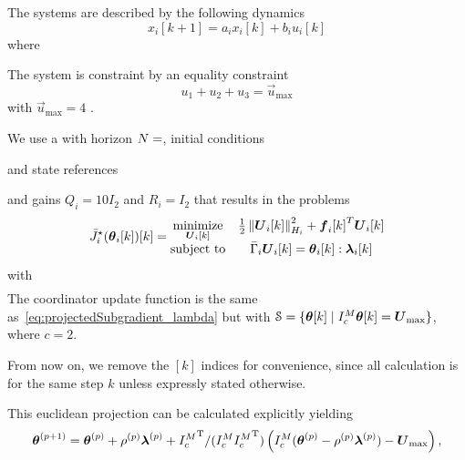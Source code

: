 \documentclass[../main.tex]{subfiles}
\begin{document}
The systems are described by the following \ltidt{} dynamics
\begin{equation}
  \label{eq:example_dynamics}
  x_{i}[k+1]=a_{i}x_{i}[k]+b_{i}u_{i}[k]
\end{equation}
where

The system is
constraint by an equality constraint
\begin{equation}
  \label{eq:example_equality}
  u_{1}+u_{2}+u_{3}=\vec{u}_{\max}
\end{equation}
with
$\vec{u}_{\max}=4$
.

We use a \dmpc{} with horizon ${N=}$,
initial conditions

and state references

and gains
$Q_{i}=10I_{2}$ and
$R_{i}=   I_{2}$
that results in the problems
\begin{equation}
    \eqoptobji(\thetaik)[k]=
    \begin{matrix}
    \minimize\limits_{\vec{U}_{i}[k]}&\frac{1}{2}\norm{\vec{U}_{i}[k]}^{2}_{H_{i}} + {\vec{f}_{i}[k]}^{T}\vec{U}_{i}[k]\\
    \mathrm{subject~ to} & \bar{\Gamma}_{i}\vec{U}_{i}[k] = \thetaik:\lambdaik
  \end{matrix}
  \label{eq:example_local_problem}
\end{equation}
with
\begin{equation}
  \label{eq:1}
  \begin{array}{lll}
    
  \end{array}
\end{equation}
The coordinator update function is the same as~\eqref{eq:projectedSubgradient_lambda} but with ${\mathcal{S} = \{\boldsymbol{\theta}[k]\mid I_{c}^{M}\boldsymbol{\theta}[k] = \boldsymbol{U}_{\max}\}}$, where $c=2$.

From now on, we remove the $[k]$ indices for convenience, since all calculation is for the same step $k$ unless expressly stated otherwise.

This euclidean projection can be calculated explicitly yielding
\begin{equation}
  \label{eq:euclidean_projection_equality_solution}
    \boldsymbol{\theta}^{(p+1)}=\boldsymbol{\theta}^{(p)}+\rho^{(p)}\boldsymbol{\lambda}^{(p)}+{I_{c}^M}^{\mathrm{T}}/({I_{c}^M} {I_{c}^M}^{\mathrm{T}})\left({I_{c}^M}(\boldsymbol{\theta}^{(p)}-\rho^{(p)}\boldsymbol{\lambda}^{(p)}) -\boldsymbol{U}_{\max}\right),
\end{equation}
\end{document}
